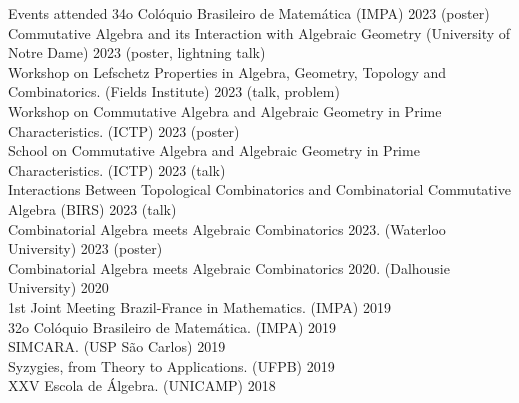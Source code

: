 \documentclass{resume} %
\begin{document}
\begin{rSection}{Events attended}
34o Colóquio Brasileiro de Matemática (IMPA) 2023 (poster)
\\ Commutative Algebra and its Interaction with Algebraic Geometry (University of Notre Dame) 2023 (poster, lightning talk)
\\ Workshop on Lefschetz Properties in Algebra, Geometry, Topology and Combinatorics. (Fields Institute) 2023 (talk, problem)
\\ Workshop on Commutative Algebra and Algebraic Geometry in Prime Characteristics. (ICTP) 2023 (poster)
\\ School on Commutative Algebra and Algebraic Geometry in Prime Characteristics. (ICTP) 2023 (talk)
\\ Interactions Between Topological Combinatorics and Combinatorial Commutative Algebra (BIRS) 2023 (talk)
\\ Combinatorial Algebra meets Algebraic Combinatorics 2023. (Waterloo University) 2023 (poster)%
\\ Combinatorial Algebra meets Algebraic Combinatorics 2020. (Dalhousie University) 2020
\\ 1st Joint Meeting Brazil-France in Mathematics. (IMPA) 2019
\\ 32o Colóquio Brasileiro de Matemática. (IMPA) 2019
\\ SIMCARA. (USP São Carlos) 2019
\\ Syzygies, from Theory to Applications. (UFPB) 2019
\\ XXV Escola de Álgebra. (UNICAMP) 2018
\\
\end{rSection}


\end{document}
